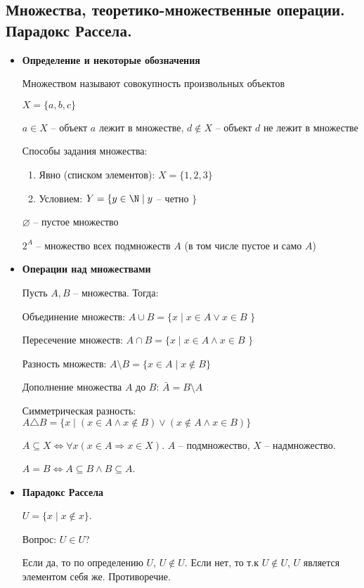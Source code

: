 \subsection{Множества, теоретико-множественные операции. Парадокс Рассела.}
\begin{itemize}
	\item \textbf{Определение и некоторые обозначения}
	
Множеством называют совокупность произвольных объектов

$X = \{a, b, c\}$

$a \in X$ -- объект $a$ лежит в множестве, $d \notin X$ -- объект $d$ не лежит в множестве

Способы задания множества:
\begin{enumerate}
	\item Явно (списком элементов): $X = \{1, 2, 3\}$
	\item Условием: $Y = \{ y \in \N \mid y$ -- четно $\}$
\end{enumerate}

$\varnothing$ -- пустое множество

$2^{A}$ -- множество всех подмножеств $A$ (в том числе пустое и само $A$)

\item \textbf{Операции над множествами}

Пусть $A, B$ -- множества. Тогда:

Объединение множеств: $A \cup B = \{x \mid x \in A \vee x \in B$ $\}$

Пересечение множеств: $A \cap B = \{x \mid x \in A \wedge x \in B$ $\}$

Разность множеств: $A \setminus B = \{x \in A \mid x \notin B \}$

Дополнение множества $A$ до $B$: $\bar{A} = B \setminus A$

Симметрическая разность: $A \triangle B = \{x \mid (x \in A \wedge x \notin B) \vee (x \notin A \wedge x \in B) \}$

$A \subseteq X \Leftrightarrow \forall x (x \in A \Rightarrow x \in X)$. $A$ -- подмножество, $X$ -- надмножество.

$A = B \Leftrightarrow A \subseteq B \wedge B \subseteq A$.

\item \textbf{Парадокс Рассела}

$U = \{x \mid x \notin x\}$.

Вопрос: $U \in U$?

Если да, то по определению $U$, $U \notin U$. Если нет, то т.к $U \notin U$, $U$ является элементом себя же. Противоречие. 

\end{itemize}